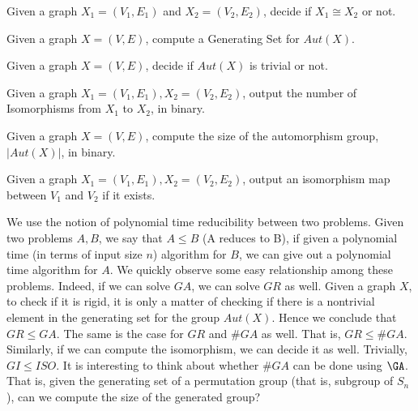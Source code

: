 \begin{problem}
Given a graph $X_1=(V_1,E_1)$ and $X_2=(V_2,E_2)$, decide if $X_1\cong X_2$ or not.
\end{problem}
\begin{problem}
Given a graph $X=(V,E)$, compute a Generating Set for $Aut(X)$.
\end{problem}

\begin{problem}
Given a graph $X=(V,E)$, decide if $Aut(X)$ is trivial or not.
\end{problem}

\begin{problem}
Given a graph $X_1=(V_1,E_1),X_2=(V_2,E_2)$, output the number of Isomorphisms from $X_1$ to $X_2$, in binary.
\end{problem}

\begin{problem}
Given a graph $X=(V,E)$, compute the size of the automorphism group, $|Aut(X)|$, in binary.
\end{problem}

\begin{problem}
Given a graph $X_1=(V_1,E_1),X_2=(V_2,E_2)$, output an isomorphism map between $V_1$ and $V_2$ if it exists.
\end{problem}

We use the notion of polynomial time reducibility between two problems. Given two problems $A,B$, we say that $A \le B$ (A reduces to B), if given a polynomial time (in terms of input size $n$) algorithm for $B$, we can give out a polynomial time algorithm for $A$. We quickly observe some easy relationship among these problems. Indeed, if we can solve $GA$, we can solve $GR$ as well. Given a graph $X$, to check if it is rigid, it is only a matter of checking if there is a nontrivial element in the generating set for the group $Aut(X)$. Hence we conclude that 
$GR \le GA$. The same is the case for $GR$ and $\#GA$ as well. That is, $GR \le \#GA$. Similarly, if we can compute the isomorphism, we can decide it as well. Trivially, $GI \le ISO$. It is interesting to think about whether $\#GA$ can be done using $\GA$. That is, given the generating set of a permutation group (that is, subgroup of $S_n$), can we compute the size of the generated group?


